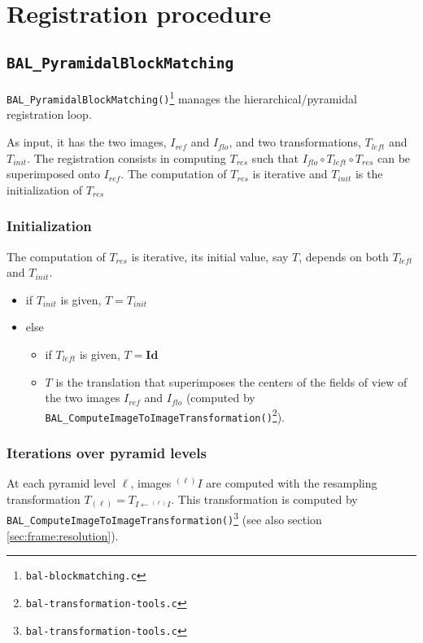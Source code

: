 
\chapter{Registration procedure}

\section{\texttt{BAL\_PyramidalBlockMatching}}

\texttt{BAL\_PyramidalBlockMatching()}\footnote{\texttt{bal-blockmatching.c}} 
manages the hierarchical/pyramidal registration loop.

As input, it has the two images, $I_{ref}$ and $I_{flo}$, and two
transformations, $T_{left}$ and $T_{init}$. The registration consists
in computing $T_{res}$ such that $I_{flo} \circ T_{left} \circ
T_{res}$ can be superimposed onto $I_{ref}$. The computation of
$T_{res}$ is iterative and $T_{init}$ is the initialization of $T_{res}$


\subsection{Initialization}
\label{sec:devel:doc:trsfs:initialization}
The computation of
$T_{res}$ is iterative, its initial value, say $T$, depends on both
$T_{left}$ and $T_{init}$.
\begin{itemize}
\item if $T_{init}$ is given, $T = T_{init}$
\item else 
\begin{itemize}
\item if $T_{left}$ is given, $T = \mathbf{Id}$
\item $T$ is the translation that superimposes the
centers of the fields of view of the two images $I_{ref}$ and
$I_{flo}$ (computed by \texttt{BAL\_Compute\-ImageToImageTransformation()}\footnote{\texttt{bal-transformation-tools.c}}).
\end{itemize}
\end{itemize}



\subsection{Iterations over pyramid levels}

At each pyramid level $\ell$, images ${}^{(\ell)}I$ are computed with
the resampling transformation $T_{(\ell)} = T_{I \leftarrow
  {}^{(\ell)}I}$. This transformation is computed by
\texttt{BAL\_Compute\-ImageToImageTransformation()}\footnote{\texttt{bal-transformation-tools.c}}
(see also section \ref{sec:frame:resolution}).

